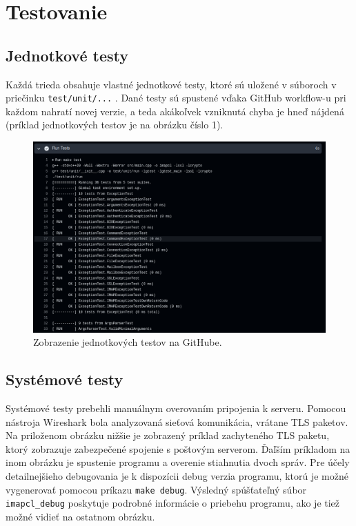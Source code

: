 \documentclass[a4paper, 11pt]{article}
\begin{document}
	\section{Testovanie}

	\subsection{Jednotkové testy}
	Každá trieda obsahuje vlastné jednotkové testy, ktoré sú uložené v súboroch v priečinku \texttt{test/unit/...} . Dané testy sú spustené vďaka GitHub workflow-u pri každom nahratí novej verzie, a teda akákoľvek vzniknutá chyba je hneď nájdená (príklad jednotkových testov je na obrázku číslo 1).
	\label{subsection:testunit}
	\begin{figure}[!ht]
		\centering
		\vspace{1cm}
		\includegraphics[width=0.9\linewidth]{res/test_unit.png}
		\caption{Zobrazenie jednotkových testov na GitHube.}
		\label{figure:testunit}
	\end{figure}

	\subsection{Systémové testy}
	Systémové testy prebehli manuálnym overovaním pripojenia k serveru. Pomocou nástroja Wireshark bola analyzovaná sieťová komunikácia, vrátane TLS paketov. Na priloženom obrázku nižšie je zobrazený príklad zachyteného TLS paketu, ktorý zobrazuje zabezpečené spojenie s poštovým serverom.\newline
	Ďaľším príkladom na inom obrázku je spustenie programu a overenie stiahnutia dvoch správ.\newline
	Pre účely detailnejšieho debugovania je k dispozícii debug verzia programu, ktorú je možné vygenerovať pomocou príkazu \texttt{make debug}. Výsledný spúšťateľný súbor \texttt{imapcl\_debug} poskytuje podrobné informácie o priebehu programu, ako je tiež možné vidieť na ostatnom obrázku.
\end{document}
